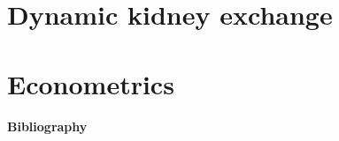 \documentclass[12pt,a4paper,oneside]{book}
\theoremstyle{definition}
\theoremstyle{Assumption}
\begin{document}
\frontmatter

\setcounter{page}{2}




\clearpage
\onehalfspacing
\tableofcontents
 
{}
{}
\listoffigures

{}
{}
\listoftables

\clearpage

\renewcommand{\thetable}{\arabic{table}}
\setcounter{table}{0}

 
\mainmatter
\part{Dynamic kidney exchange}


\part{Econometrics}



 
\appendix
\backmatter


\begingroup
\renewcommand{\chapter}[2]{}%
\begin{center}
  {\vspace*{-1cm}\selectfont\huge\bfseries  Bibliography}
\end{center}

\singlespacing


\end{document}
